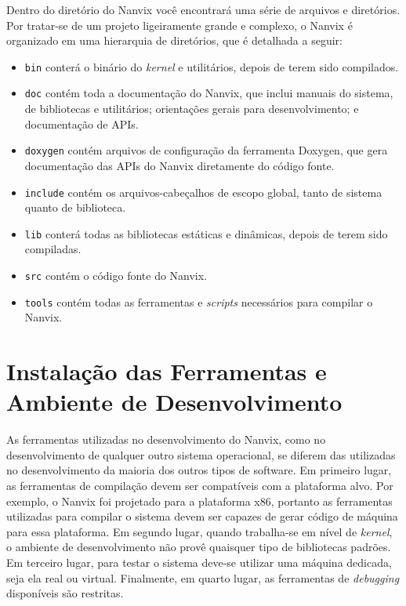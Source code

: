 \documentclass[11pt]{article}
\begin{document}
\vspace{0.3cm}
Dentro do diretório do Nanvix você encontrará uma série de arquivos e diretórios. Por tratar-se de um projeto ligeiramente grande e complexo, o Nanvix é organizado em uma hierarquia de diretórios, que é detalhada a seguir:

\begin{itemize}
    \item \texttt{bin} conterá o binário do \textit{kernel} e utilitários, depois de terem sido compilados.
    \item \texttt{doc} contém toda a documentação do Nanvix, que inclui manuais do sistema, de bibliotecas e utilitários; orientações gerais para desenvolvimento; e documentação de APIs.
    \item \texttt{doxygen} contém arquivos de configuração da ferramenta Doxygen, que gera documentação das APIs do Nanvix diretamente do código fonte.
    \item \texttt{include} contém os arquivos-cabeçalhos de escopo global, tanto de sistema quanto de biblioteca.
    \item \texttt{lib} conterá todas as bibliotecas estáticas e dinâmicas, depois de terem sido compiladas.
    \item \texttt{src} contém o código fonte do Nanvix.
    \item \texttt{tools} contém todas as ferramentas e \textit{scripts} necessários para compilar o Nanvix.
\end{itemize}

\section{Instalação das Ferramentas e Ambiente de Desenvolvimento}
\label{sec:ferramentas}

As ferramentas utilizadas no desenvolvimento do Nanvix, como no desenvolvimento de qualquer outro sistema operacional, se diferem das utilizadas no desenvolvimento da maioria dos outros tipos de software. Em primeiro lugar, as ferramentas de compilação devem ser compatíveis com a plataforma alvo. Por exemplo, o Nanvix foi projetado para a plataforma x86, portanto as ferramentas utilizadas para compilar o sistema devem ser capazes de gerar código de máquina para essa plataforma. Em segundo lugar, quando trabalha-se em nível de \textit{kernel}, o ambiente de desenvolvimento não provê quaisquer tipo de bibliotecas padrões. Em terceiro lugar, para testar o sistema deve-se utilizar uma máquina dedicada, seja ela real ou virtual. Finalmente, em quarto lugar, as ferramentas de \textit{debugging} disponíveis são restritas.
\end{document}
